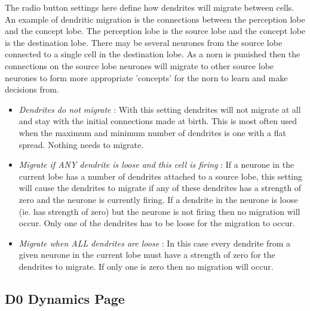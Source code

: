 \documentclass[11pt,twoside,a4paper]{article}
\begin{document}
The radio button settings here define how dendrites will migrate between cells. An example of dendritic migration is the connections between the perception lobe and the concept lobe. The perception lobe is the source lobe and the concept lobe is the destination lobe. There may be several neurones from the source lobe connected to a single cell in the destination lobe. As a norn is punished then the connections on the source lobe neurones will migrate to other source lobe neurones to form more appropriate 'concepts' for the norn to learn and make decisions from. 
\begin{itemize}
	\item[] \emph{Dendrites do not migrate} : With this setting dendrites will not migrate at all and stay with the initial connections made at birth. This is most often used when the maximum and minimum number of dendrites is one with a flat spread. Nothing needs to migrate.
	\item[] \emph{Migrate if ANY dendrite is loose and this cell is firing} : If a neurone in the current lobe has a number of dendrites attached to a source lobe, this setting will cause the dendrites to migrate if any of these dendrites has a strength of zero and the neurone is currently firing. If a dendrite in the neurone is loose (ie. has strength of zero) but the neurone is not firing then no migration will occur. Only one of the dendrites has to be loose for the migration to occur.
	\item[] \emph{Migrate when ALL dendrites are loose} : In this case every dendrite from a given neurone in the current lobe must have a strength of zero for the dendrites to migrate. If only one is zero then no migration will occur.
\end{itemize}


\subsection{D0 Dynamics Page}
\end{document}
